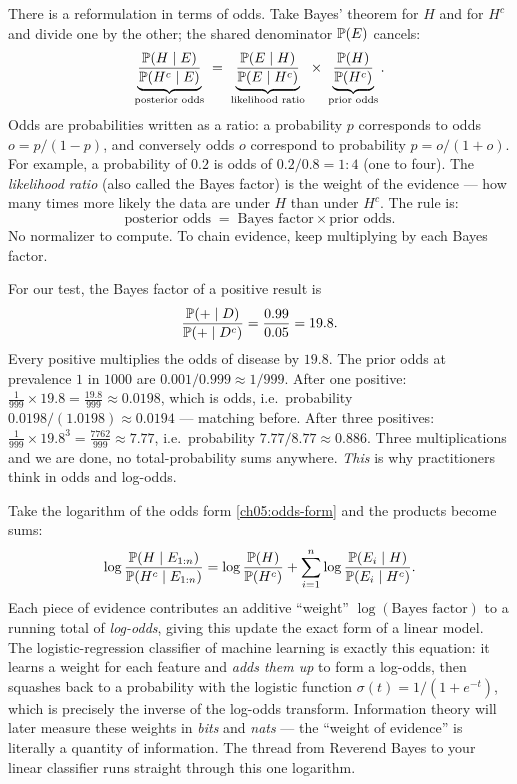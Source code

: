 There is a reformulation in terms of odds. Take Bayes' theorem for $H$ and for $H^c$ and divide one by the other; the
shared denominator $\P(E)$ cancels:
\begin{equation}
  \underbrace{\frac{\P(H\given E)}{\P(H^c\given E)}}_{\text{posterior odds}}
  \;=\;
  \underbrace{\frac{\P(E\given H)}{\P(E\given H^c)}}_{\text{likelihood ratio}}
  \;\times\;
  \underbrace{\frac{\P(H)}{\P(H^c)}}_{\text{prior odds}}.
  \label{ch05:odds-form}
\end{equation}
Odds are probabilities written as a ratio: a probability $p$ corresponds to
odds $o = p/(1-p)$, and conversely odds $o$ correspond to probability $p = o/(1+o)$. For
example, a probability of $0.2$ is odds of $0.2/0.8 = 1{:}4$ (one to four). The
\emph{likelihood ratio} (also called the Bayes factor) is the weight of the evidence ---
how many times more likely the data are under $H$ than under $H^c$. The rule is:
\[
  \text{posterior odds} \;=\; \text{Bayes factor} \times \text{prior odds}.
\]
No normalizer to compute. To chain evidence, keep multiplying by each Bayes factor.

\begin{example}
For our test, the Bayes factor of a positive result is
\[
  \frac{\P(+\given D)}{\P(+\given D^c)} = \frac{0.99}{0.05} = 19.8.
\]
Every positive multiplies the odds of disease by $19.8$. The prior odds at prevalence
$1$ in $1000$ are $0.001/0.999 \approx 1/999$. After one positive:
$\frac{1}{999}\times 19.8 = \frac{19.8}{999} \approx 0.0198$, which is odds, i.e.\
probability $0.0198/(1.0198) \approx 0.0194$ --- matching before. After three positives:
$\frac{1}{999}\times 19.8^3 = \frac{7762}{999}\approx 7.77$, i.e.\ probability
$7.77/8.77 \approx 0.886$. Three multiplications and we are done, no total-probability
sums anywhere. \emph{This} is why practitioners think in odds and log-odds.
\end{example}

\begin{connectionbox}
Take the logarithm of the odds form \eqref{ch05:odds-form} and the products become sums:
\[
  \log\frac{\P(H\given E_{1:n})}{\P(H^c\given E_{1:n})}
  = \log\frac{\P(H)}{\P(H^c)} + \sum_{i=1}^{n}\log\frac{\P(E_i\given H)}{\P(E_i\given H^c)}.
\]
Each piece of evidence contributes an additive ``weight'' $\log(\text{Bayes factor})$ to
a running total of \emph{log-odds}, giving this update the exact form of a linear model.
The logistic-regression classifier of machine learning is exactly this equation: it
learns a weight for each feature and \emph{adds them up} to form a log-odds, then squashes
back to a probability with the logistic function $\sigma(t) = 1/(1+e^{-t})$, which is
precisely the inverse of the log-odds transform. Information theory will later measure
these weights in \emph{bits} and \emph{nats} --- the ``weight of evidence'' is literally
a quantity of information. The thread from Reverend Bayes to your linear classifier runs
straight through this one logarithm.
\end{connectionbox}

